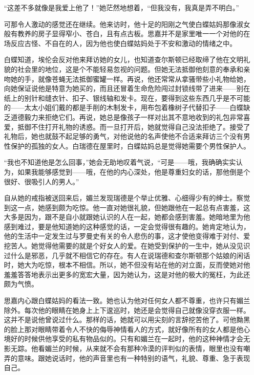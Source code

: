 \par “这差不多就像是我爱上他了！”她茫然地想着，“但我没有，我真是弄不明白。”
\par 可那令人激动的感觉还在继续。他来访时，他十足的阳刚之气使白蝶姑妈那像淑女般有教养的房子显得窄小、苍白，且有点古板。思嘉并不是家里唯一一个对他的在场反应古怪、不自在的人，因为他也使白蝶姑妈处于不安和激动的情绪之中。
\par 白蝶知道，埃伦会反对他来拜访她的女儿，也知道查尔斯顿已经取缔了他在文明礼貌的社会里的地位，这是个不能轻易忽视的问题。但她无法抵御他刻意的奉承和亲吻她的手，就像苍蝇无法抵御蜜罐一样。再说，他还常常从拿骚带些小礼物给她，向她保证说他是特意为她买的，而且还冒着生命危险闯过封锁线带了进来——别在纸上的别针和缝衣针、扣子、银线轴和发卡。现在，要得到这些东西几乎是不可能的——太太小姐们戴的都是手削的木制发卡，用布包着橡树子代替扣子——白蝶缺乏道德毅力来拒绝它们。再说，她总是像孩子一样对出其不意地收到的礼包非常喜爱，抵御不住打开礼物的诱惑。而一旦打开后，她就觉得自己没法拒绝了。接受了礼物后，她也就鼓不起足够的勇气，对他说他的名声使他不合适来拜访三个没有男性保护的孤独的女人。白瑞德在屋里时，白蝶姑妈总是觉得她需要个男性保护人。
\par “我也不知道他是怎么回事，”她会无助地叹着气说，“可是——哦，我确确实实认为，如果我能够感觉到——哦，在他的内心深处，他是尊重妇女的话，那他倒是个很好、很吸引人的男人。”
\par 自从她的戒指被送回来后，媚兰发现瑞德是个举止优雅、心细得少有的绅士。察觉到这一点，她感到颇为吃惊。他一直对她很礼貌，但她跟他在一起总有点害羞，这大多是因为，跟不是自小就跟她认识的人在一起，她都会感到害羞。她暗地里为他感到难过，要是他知道她的这种感觉的话，一定会觉得很有趣的。她肯定地认为，他的生活中一定发生过与罗曼史有关的令人悲伤的事，这才使他变得难于对付、爱挖苦人。她觉得他需要的就是个好女人的爱。在她受到保护的一生中，她从没见识过什么是邪恶，几乎就不相信它的存在。有人在说瑞德和查尔斯顿那个姑娘的闲话时，她大为吃惊，根本不相信。所以，她不但没有站在他的对立面，反而使她对他羞羞答答地表示出更多的宽宏大量，因为她认为，这是对他的极大的冤枉，为此还颇为气愤。
\par 思嘉内心跟白蝶姑妈的看法一致。她也认为他对任何女人都不尊重，也许只有媚兰除外。每次他的眼睛在她身上上下逡巡时，她还是会觉得自己就像没穿衣服一样。这并不是说他曾说过什么。那样的话，她就可以用尖刻的言辞挖苦他了。可他黝黑的脸上那对眼睛带着令人不快的侮辱神情看人的方式，就好像所有的女人都是他心境好的时候供他享受的私有物品似的。只有和媚兰在一起时，他的这种神情才会无影无踪。他看媚兰的时候，从来就不会有那种冷漠的评判似的表情，眼里也没有嘲弄的意味。跟她说话时，他的声音里也有一种特别的语气，礼貌、尊重、急于表现自己。
